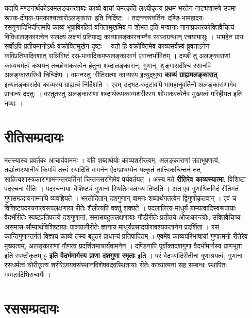 {यद्यपि मण्डनार्थकोऽयमलङ्कारशब्दः काव्ये वाचां चमत्कृतिं लक्ष्यीकृत्य प्रथमं भरतेन नाट्यशास्त्रे उपमा-रूपक-दीपक-यमकाश्चत्वारोऽलङ्काराः इति निर्दिष्टः । तदनन्तरवर्तिनः दण्डि-भामहादयः रसगुणादिभिर्दीप्तमपि काव्यं भूषाविरहितं वनितामुखमिव न शोभत इति मन्वानाः नानाप्रकारकोक्तिवैचित्यं विविधालङ्कारत्वेन सलक्ष्यं लक्षणं प्रतिपाद्य काव्यालङ्कारनाम्नैव स्वस्वग्रन्थान् रचयामासुः । भामहेन प्रायः सर्वोऽपि प्रतीयमानोऽर्थः वक्रोक्तिमुखेन दृष्टः । यतो हि वक्रोक्तिमेव काव्यसर्वस्वं ब्रुवताऽनेन कविप्रतिभादिवशात् सन्निविष्टं रस-भावादिकमप्यलङ्कारवर्ग एवान्तर्भावितम् । दण्डी तु अलङ्काराणां काव्यधर्मत्वं कथयन् तच्छोभाकरत्वेन हेतुना शब्दालङ्कारान्, गुणान्, शृङ्गारादींश्च रसानपि अलङ्कारपरिधौ निचिक्षेप । वामनस्तु ‘रीतिरात्मा काव्यस्य इ्रत्युद्घुष्य \textbf{काव्यं ग्राह्यमलङ्कारात्} इत्यलङ्कारादेव काव्यस्य ग्राह्यत्वं निर्दिशति ।   एवम् उद्भट-रुद्रटावपि भामहानुवर्तिनौ अलङ्काराणामेव प्राधान्यं ददतुः । वस्तुतस्तु अलङ्काराणां शब्दार्थरूपकाव्यशरीरस्य  शोभाकरत्वेनैव मुख्यत्वं परिहीयत इति नव्याः ।

\section*{ रीतिसम्प्रदायः}

मतस्यास्य प्रवर्तकः आचार्यवामनः । यदि शब्दार्थयोः काव्यशरीरत्वम्, अलङ्काराणां तदाभूषणत्वं, तर्ह्यात्मस्थानीयं किमपि तत्त्वं स्यादिति वामनेन ऐदम्प्राथम्येन यत्कृतं तात्त्विकचिन्तनं तत् साहित्यशास्त्रकाराणामनन्तरवर्तिनां चिन्तनसरणिमेव पर्यवर्तयत् । अस्य मते \textbf{रीतिरेव काव्यस्यात्मा}, विशिष्टा पदरचना रीतिः । पदरचनायाः वैशिष्ट्यं गुणानां स्थितिमवलम्ब्य तिष्ठति । अत एव गुणाश्रितमिदं रीतिमतं गुणसम्प्रदायनाम्नापि व्यवह्रियते । भरतोदितान् दशगुणान् वामनः शब्दार्थगतत्वेन द्विगुणीकृतवान् । एवं च विशिष्टपदरचनात्वरूपलक्षणाया रीतेः शैलीत्यपि वक्तुं शक्यते । पदलालित्य-माधुर्य-ग्राम्यत्वादिस्वरूपायाः वैदर्भीरीतेः स्पष्टप्रतिपत्तये दशगुणानां, समासबहुललक्षणायाः गौडीरीतेः प्रतीतये ओजःकान्त्योः, उक्तिवैचित्र्य-असमास-सौम्यार्थविशिष्टायाः पाञ्चालीरीतेः ज्ञानाय माधुर्यप्रसादयोरावश्यकतानेन प्रदर्शिता । रसं कान्तिगुणान्तर्गतं विज्ञाय काव्ये तस्य बहुतरं प्राधान्यं प्रतिपादितम् । एवमेव काव्यपरिभाषायां गुणात्मनो रीतेरेव मुख्यत्वम्, अलङ्काराणां गौणत्वं प्रदर्शितमाचार्यवामनेन । दण्डिनापि पूर्वोक्तदशगुणा वैदर्भीमार्गस्य प्राणभूता इति स्पष्टीकृतम् ट्ट \textbf{इति वैदर्भमार्गस्य प्राणा दशगुणा स्मृताः} इ्रति । परं वैदर्भ्यादिरीतीनां गुणाश्रयत्वं, गुणानां रसधर्मत्वं चोरीकृत्य शरीरेऽवयवसंस्थानविशेषवदवस्थितायाः रीतेः काव्यात्मना सह सम्बन्धः स्थापितः मम्मटादिभिराचार्यैः ।

\section*{ रससम्प्रदायः --}

}
